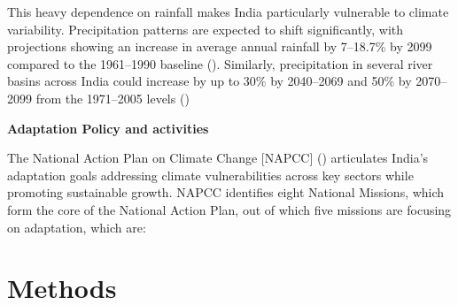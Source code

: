 \documentclass[12pt]{article}
\newcommand{\regularsubsection}[1]{%
  \vspace{1em} %
  \noindent\textbf{#1}\par\vspace{-0.3em}}
\begin{document}
This heavy dependence on rainfall makes India particularly vulnerable to climate variability. Precipitation patterns are expected 
to shift significantly, with projections showing an increase in average annual rainfall by 7–18.7\% by 2099 compared to the 1961–1990 baseline (\cite{chaturvedi_2012}).
Similarly, precipitation in several river basins across India could increase by up to 30\% by 2040–2069 and 50\% by 2070–2099 from the 1971–2005 levels (\cite{mishra_2016})





\regularsubsection{Adaptation Policy and activities}
The National Action Plan on Climate Change [NAPCC] (\cite{napcc_2008}) articulates India's adaptation goals addressing climate 
vulnerabilities across key sectors while promoting sustainable growth. NAPCC identifies eight National Missions, which form 
the core of the National Action Plan, out of which five missions are focusing on adaptation, which are:

\section*{Methods}
\end{document}
